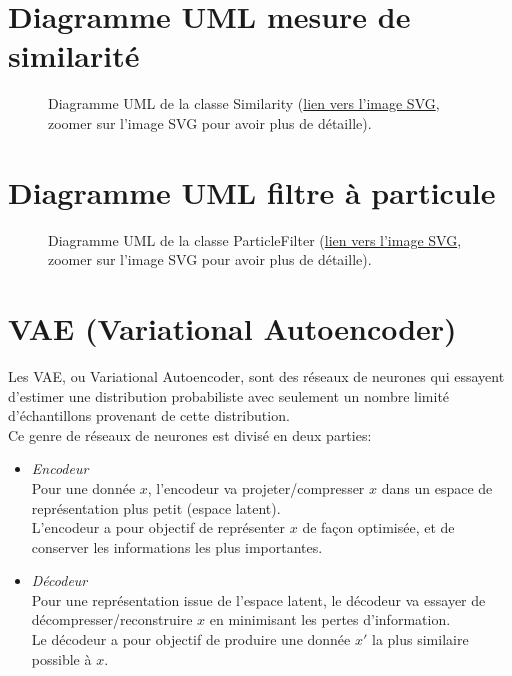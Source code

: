 \begin{appendices}
\clearpage
\section*{Diagramme UML mesure de similarité}\label{app:UMLSimilarity}
\begin{figure}[!htbp]
	\center
	\caption{Diagramme UML de la classe Similarity (\href{https://raw.githubusercontent.com/gabriel-combe/Cuttlefish_Tracker/test/rapport/UML/similarity.svg}{lien vers l'image SVG}, zoomer sur l'image SVG pour avoir plus de détaille).}
	\label{fig:uml_diagram_similarity}
\end{figure}
\FloatBarrier


\clearpage
\section*{Diagramme UML filtre à particule}\label{app:UMLParticleFilter}
\begin{figure}[!htbp]
	\center
	\caption{Diagramme UML de la classe ParticleFilter (\href{https://raw.githubusercontent.com/gabriel-combe/Cuttlefish_Tracker/test/rapport/UML/particlefilter.svg}{lien vers l'image SVG}, zoomer sur l'image SVG pour avoir plus de détaille).}
	\label{fig:uml_diagram_particlefilter}
\end{figure}
\FloatBarrier
	
	
\clearpage
\section*{VAE (Variational Autoencoder)}\label{app:variational_autoencoder}
Les VAE, ou Variational Autoencoder, sont des réseaux de neurones qui essayent d'estimer une distribution probabiliste avec seulement un nombre limité d'échantillons provenant de cette distribution.\\
Ce genre de réseaux de neurones est divisé en deux parties:\\
\begin{itemize}
	\item \emph{Encodeur}\\
	Pour une donnée $x$, l'encodeur va projeter/compresser $x$ dans un espace de représentation plus petit (espace latent).\\
	L'encodeur a pour objectif de représenter $x$ de façon optimisée, et de conserver les informations les plus importantes.\\
	\item \emph{Décodeur}\\
	Pour une représentation issue de l'espace latent, le décodeur va essayer de décompresser/reconstruire $x$ en minimisant les pertes d'information.\\
	Le décodeur a pour objectif de produire une donnée $x'$ la plus similaire possible à $x$.\\
\end{itemize}
	

\end{appendices}

